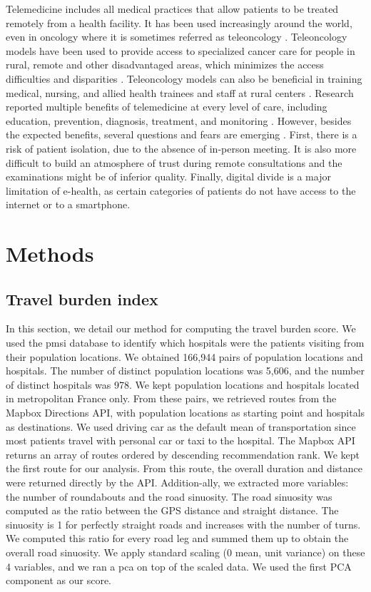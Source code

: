 Telemedicine includes all medical practices that allow patients to be treated
remotely from a health facility. It has been used increasingly around the world,
even in oncology where it is sometimes referred as teleoncology
\cite{mooi_teleoncology_2012,sabesan_are_2014,sabesan_timely_2014,sabesan_medical_2014}.
Teleoncology models have been used to provide access to specialized cancer care
for people in rural, remote and other disadvantaged areas, which minimizes the
access difficulties and disparities \cite{sabesan_telemedicine_2012,
    sabesan_are_2014}. Teleoncology models can also be beneficial in training
medical, nursing, and allied health trainees and staff at rural centers
\cite{sabesan_medical_2014}. Research reported multiple benefits of telemedicine
at every level of care, including education, prevention, diagnosis, treatment,
and monitoring \cite{bertucci_outpatient_2019}. However, besides the expected
benefits, several questions and fears are emerging
\cite{bertucci_outpatient_2019}. First, there is a risk of patient isolation,
due to the absence of in-person meeting. It is also more difficult to build an
atmosphere of trust during remote consultations and the examinations might be of
inferior quality. Finally, digital divide is a major limitation of e-health, as
certain categories of patients do not have access to the internet or to a
smartphone.

\section{Methods}

\subsection{Travel burden index}

In this section, we detail our method for computing the travel burden score. We
used the \ac{pmsi} database to identify which hospitals were the patients
visiting from their population locations. We obtained 166,944 pairs of
population locations and hospitals. The number of distinct population locations
was 5,606, and the number of distinct hospitals was 978. We kept population
locations and hospitals located in metropolitan France only. From these pairs,
we retrieved routes from the Mapbox Directions API, with population locations as
starting point and hospitals as destinations.  We used driving car as the
default mean of transportation since most patients travel with personal car or
taxi to the hospital. The Mapbox API returns an array of routes ordered by
descending recommendation rank. We kept the first route for our analysis. From
this route, the overall duration and distance were returned directly by the API.
Addition-ally, we extracted more variables: the number of roundabouts and the
road sinuosity. The road sinuosity was computed as the ratio between the GPS
distance and straight distance. The sinuosity is 1 for perfectly straight roads
and increases with the number of turns. We computed this ratio for every road
leg and summed them up to obtain the overall road sinuosity. We apply standard
scaling (0 mean, unit variance) on these 4 variables, and we ran a \ac{pca} on
top of the scaled data. We used the first PCA component as our score.

